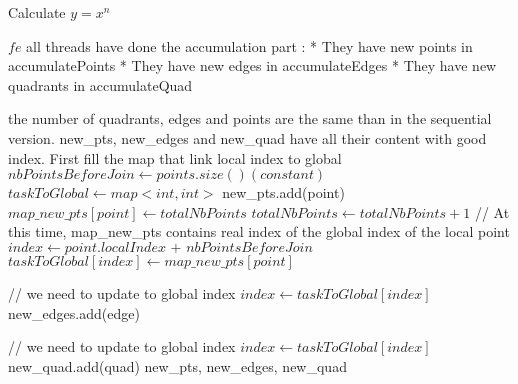 \documentclass{article}
\begin{document}
\begin{algorithm}
\caption{Calculate $y = x^n$}
\begin{algorithmic}
\RETURN $fe$
\REQUIRE all threads have done the accumulation part :
\newline \tabto{1.3cm} * They have new points in accumulatePoints
\newline \tabto{1.3cm} * They have new edges in accumulateEdges
\newline \tabto{1.3cm} * They have new quadrants in accumulateQuad


\ENSURE the number of quadrants, edges and points are the same than in the \tabto{1.3cm} sequential version.
\newline \tabto{1.3cm} new\_pts, new\_edges and new\_quad have all their content with good \tabto{1.3cm}index.
\STATE
\STATE First fill the map that link local index to global
\STATE $nbPointsBeforeJoin \leftarrow points.size() (constant)$
	\STATE $taskToGlobal \leftarrow map<int, int>$ 
			\STATE new\_pts.add(point)
			\STATE $map\_new\_pts[point] \leftarrow totalNbPoints$
			\STATE $totalNbPoints \leftarrow totalNbPoints + 1$
		\ENDIF
		\STATE // At this time, map\_new\_pts contains real index of the global index of the local point
		\STATE $index \leftarrow point.localIndex \texttt{ + } nbPointsBeforeJoin$
		\STATE $taskToGlobal[index]\leftarrow map\_new\_pts[point]$
	\ENDFOR

    \STATE
				\STATE // we need to update to global index
				\STATE $index \leftarrow taskToGlobal[index]$
			\ENDIF
			\ENDFOR
		\STATE new\_edges.add(edge)
        
    \STATE

				\STATE // we need to update to global index
				\STATE $index \leftarrow taskToGlobal[index]$
			\ENDIF
		\ENDFOR
		\STATE new\_quad.add(quad)
\STATE
\RETURN new\_pts, new\_edges, new\_quad
\ENDFOR

\end{algorithmic}
\end{algorithm}
\end{document}
